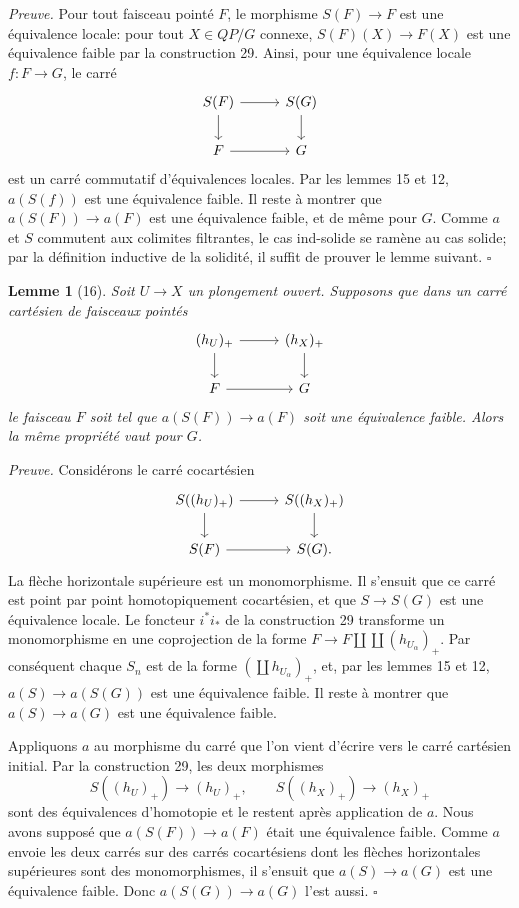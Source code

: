 \documentclass[11pt]{article}
\theoremstyle{deligne}
\newtheorem*{lemma*}{Lemme}
\newenvironment{proofdel}{\noindent\textit{Preuve.}}{\hfill$\square$}
\begin{document}
\begin{proofdel}
Pour tout faisceau pointé \(F\), le morphisme \(S(F)\to F\) est une équivalence locale: pour tout \(X\in QP/G\) connexe, \(S(F)(X)\to F(X)\) est une équivalence faible par la construction 29. Ainsi, pour une équivalence locale \(f:F\to G\), le carré
\[
\begin{tikzcd}[column sep=2.8em,row sep=1.8em]
S(F) \arrow[r] \arrow[d] & S(G) \arrow[d]\\
F \arrow[r] & G
\end{tikzcd}
\]
est un carré commutatif d'équivalences locales. Par les lemmes 15 et 12, \(a(S(f))\) est une équivalence faible. Il reste à montrer que \(a(S(F))\to a(F)\) est une équivalence faible, et de même pour \(G\). Comme \(a\) et \(S\) commutent aux colimites filtrantes, le cas ind-solide se ramène au cas solide; par la définition inductive de la solidité, il suffit de prouver le lemme suivant.
\end{proofdel}

\begin{lemma*}[16]
Soit \(U\to X\) un plongement ouvert. Supposons que dans un carré cartésien de faisceaux pointés
\[
\begin{tikzcd}[column sep=2.8em,row sep=1.8em]
(h_U)_+ \arrow[r] \arrow[d] & (h_X)_+ \arrow[d]\\
F \arrow[r] & G
\end{tikzcd}
\]
le faisceau \(F\) soit tel que \(a(S(F))\to a(F)\) soit une équivalence faible. Alors la même propriété vaut pour \(G\).
\end{lemma*}

\begin{proofdel}
Considérons le carré cocartésien
\[
\begin{tikzcd}[column sep=2.8em,row sep=1.8em]
S((h_U)_+) \arrow[r] \arrow[d] & S((h_X)_+) \arrow[d]\\
S(F) \arrow[r] & S(G).
\end{tikzcd}
\]
La flèche horizontale supérieure est un monomorphisme. Il s'ensuit que ce carré est point par point homotopiquement cocartésien, et que \(S\to S(G)\) est une équivalence locale. Le foncteur \(i^*i_*\) de la construction 29 transforme un monomorphisme en une coprojection de la forme \(F\to F\amalg\coprod(h_{U_\alpha})_+\). Par conséquent chaque \(S_n\) est de la forme \((\coprod h_{U_\alpha})_+\), et, par les lemmes 15 et 12, \(a(S)\to a(S(G))\) est une équivalence faible. Il reste à montrer que \(a(S)\to a(G)\) est une équivalence faible.

Appliquons \(a\) au morphisme du carré que l'on vient d'écrire vers le carré cartésien initial. Par la construction 29, les deux morphismes
\[
S((h_U)_+)\to(h_U)_+,\qquad S((h_X)_+)\to(h_X)_+
\]
sont des équivalences d'homotopie et le restent après application de \(a\). Nous avons supposé que \(a(S(F))\to a(F)\) était une équivalence faible. Comme \(a\) envoie les deux carrés sur des carrés cocartésiens dont les flèches horizontales supérieures sont des monomorphismes, il s'ensuit que \(a(S)\to a(G)\) est une équivalence faible. Donc \(a(S(G))\to a(G)\) l'est aussi.
\end{proofdel}
\end{document}
